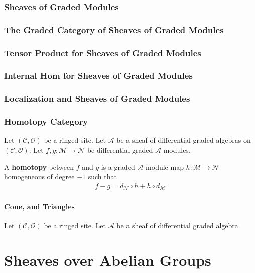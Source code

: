 \documentclass[Total.tex]{subfiles}
\begin{document}
				\subsection{Sheaves of Graded Modules}
				\subsection{The Graded Category of Sheaves of Graded Modules}
				\subsection{Tensor Product for Sheaves of Graded Modules}
				\subsection{Internal Hom for Sheaves of Graded Modules}
				\subsection{Localization and Sheaves of Graded Modules}
				\subsection{Homotopy Category}
					\begin{Def}
						Let $(\mathcal{C},\mathcal{O})$ be a ringed site. Let $\mathcal{A}$ be a sheaf of differential graded algebras on $(\mathcal{C},\mathcal{O})$. Let $f,g:\mathcal{M}\rightarrow \mathcal{N}$ be differential graded $\mathcal{A}$-modules.
						
						A \textbf{homotopy} between $f$ and $g$ is a graded $\mathcal{A}$-module map $h:\mathcal{M}\rightarrow \mathcal{N}$ homogeneous of degree $-1$ such that
						\begin{gather*}
							f-g=d_\mathcal{N}\circ h+h\circ d_\mathcal{M}
						\end{gather*}
						
					\end{Def}
					\subsubsection{Cone, and Triangles}
						\begin{lemma}
							Let $(\mathcal{C},\mathcal{O})$ be a ringed site. Let $\mathcal{A}$ be a sheaf of differential graded algebra
						\end{lemma}
	\chapter{Sheaves over Abelian Groups}
	
\end{document}
